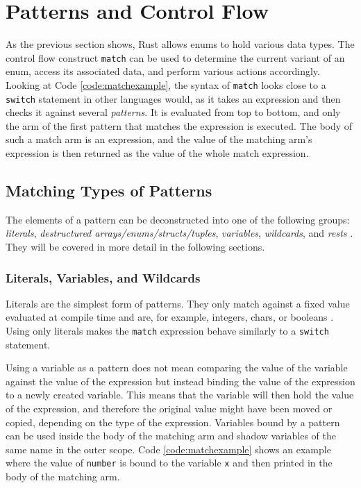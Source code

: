 \section{Patterns and Control Flow}  \label{sec:patterns}
As the previous section shows, Rust allows enums to hold various data types.
The control flow construct \texttt{match} can be used to determine the current variant of an enum, access its associated data, and perform various actions accordingly.
Looking at Code \ref{code:matchexample}, the syntax of \texttt{match} looks close to a \texttt{switch} statement in other languages would, as it takes an expression and then checks it against several \textit{patterns}.
It is evaluated from top to bottom, and only the arm of the first pattern that matches the expression is executed.
The body of such a match arm is an expression, and the value of the matching arm's expression is then returned as the value of the whole match expression.


\subsection{Matching Types of Patterns}
The elements of a pattern can be deconstructed into one of the following groups: \textit{literals}, \textit{destructured arrays/enums/structs/tuples}, \textit{variables}, \textit{wildcards}, and \textit{rests} \cite[Chapter~18]{rustbook} \cite[Chapter~9]{rustref}.
They will be covered in more detail in the following sections.

\subsubsection{Literals, Variables, and Wildcards}
Literals are the simplest form of patterns. They only match against a fixed value evaluated at compile time and are, for example, integers, chars, or booleans \cite[Chapter~8.2.1]{rustref}.
Using only literals makes the \texttt{match} expression behave similarly to a \texttt{switch} statement.

Using a variable as a pattern does not mean comparing the value of the variable against the value of the expression but instead binding the value of the expression to a newly created variable.
This means that the variable will then hold the value of the expression, and therefore the original value might have been moved or copied, depending on the type of the expression.
Variables bound by a pattern can be used inside the body of the matching arm and shadow variables of the same name in the outer scope.
Code \ref{code:matchexample} shows an example where the value of \texttt{number} is bound to the variable \texttt{x} and then printed in the body of the matching arm.

